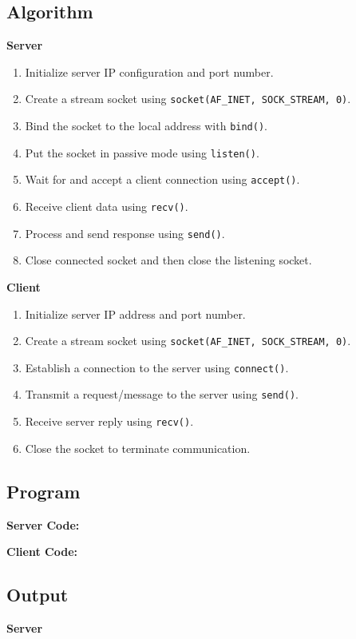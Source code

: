 \documentclass{article}
\begin{document}
\subsection{Algorithm}
\noindent\textbf{Server}
\begin{enumerate}
    \item Initialize server IP configuration and port number.
    \item Create a stream socket using \texttt{socket(AF\_INET, SOCK\_STREAM, 0)}.
    \item Bind the socket to the local address with \texttt{bind()}.
    \item Put the socket in passive mode using \texttt{listen()}.
    \item Wait for and accept a client connection using \texttt{accept()}.
    \item Receive client data using \texttt{recv()}.
    \item Process and send response using \texttt{send()}.
    \item Close connected socket and then close the listening socket.
\end{enumerate}

\noindent\textbf{Client}
\begin{enumerate}
    \item Initialize server IP address and port number.
    \item Create a stream socket using \texttt{socket(AF\_INET, SOCK\_STREAM, 0)}.
    \item Establish a connection to the server using \texttt{connect()}.
    \item Transmit a request/message to the server using \texttt{send()}.
    \item Receive server reply using \texttt{recv()}.
    \item Close the socket to terminate communication.
\end{enumerate}

\subsection{Program}
\noindent\textbf{Server Code:}


\noindent\textbf{Client Code:}


\subsection{Output}
\noindent\textbf{\hspace{0.5cm}Server}
\vspace*{0.5cm}
\end{document}
